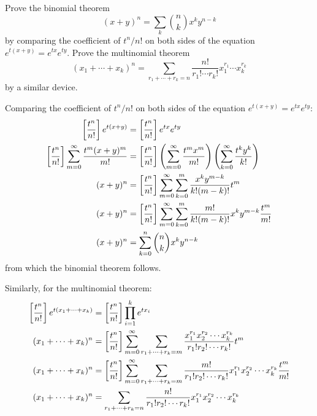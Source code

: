 \begin{exercise}
    \label{ex:2-20}
    Prove the binomial theorem
    \[
        (x+y)^n = \sum_k\binom{n}{k}x^ky^{n-k}  
    \]
    by comparing the coefficient of $t^n/n!$ on both sides of the equation $e^{t(x+y)} = e^{tx}e^{ty}$. Prove the multinomial theorem
    \[
        (x_1+\cdots+x_k)^n = \sum_{r_1+\cdots+r_k=n} \frac{n!}{r_1!\cdots r_k!}x_1^{r_1}\cdots x_k^{r_k}
    \]
    by a similar device.
\end{exercise}
\begin{solution}
    Comparing the coefficient of $t^n/n!$ on both sides of the equation $e^{t(x+y)} = e^{tx}e^{ty}$:
    {\allowdisplaybreaks
    \begin{align*}
        \coeff{\frac{t^n}{n!}} e^{t(x+y)} &= \coeff{\frac{t^n}{n!}} e^{tx}e^{ty} \\
        \coeff{\frac{t^n}{n!}} \bsum[m] \frac{t^m(x+y)^m}{m!} &= \coeff{\frac{t^n}{n!}} \left(\bsum[m] \frac{t^mx^m}{m!}\right)\left( \bsum[k] \frac{t^ky^k}{k!}\right) \\
        (x+y)^n &= \coeff{\frac{t^n}{n!}} \bsum[m] \sum_{k=0}^m \frac{x^ky^{m-k}}{k!(m-k)!} t^m \\
        (x+y)^n &= \coeff{\frac{t^n}{n!}} \bsum[m] \sum_{k=0}^m \frac{m!}{k!(m-k)!} x^ky^{m-k}\frac{t^m }{m!} \\
        (x+y)^n &= \sum_{k=0}^n \binom{n}{k}x^ky^{n-k}
    \end{align*}
    }
    from which the binomial theorem follows.

    Similarly, for the multinomial theorem:
    \begin{align*}
        \coeff{\frac{t^n}{n!}} e^{t(x_1+\cdots + x_k)} &= \coeff{\frac{t^n}{n!}} \prod_{i=1}^k e^{tx_i} \\
        (x_1+\cdots+x_k)^n &= \coeff{\frac{t^n}{n!}} \bsum[m] \sum_{r_1+\cdots+r_k = m} \frac{x_1^{r_1}x_2^{r_2}\cdots x_k^{r_k}}{r_1!r_2!\cdots r_k!} t^m \\
        (x_1+\cdots+x_k)^n &= \coeff{\frac{t^n}{n!}} \bsum[m] \sum_{r_1+\cdots+r_k = m} \frac{m!}{r_1!r_2!\cdots r_k!} x_1^{r_1}x_2^{r_2}\cdots x_k^{r_k} \frac{t^m}{m!} \\
        (x_1+\cdots+x_k)^n &= \sum_{r_1+\cdots+r_k = n} \frac{n!}{r_1!r_2!\cdots r_k!} x_1^{r_1}x_2^{r_2}\cdots x_k^{r_k}
    \end{align*}
\end{solution}

